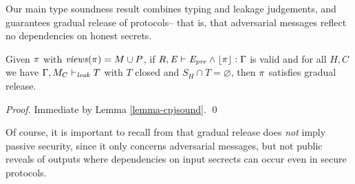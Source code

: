 Our main type soundness result combines typing and leakage judgements,
and guarantees gradual release of protocols-- that is, that adversarial
messages reflect no dependencies on honest secrets.
\begin{theorem}
  Given $\pi$ with $\mathit{views}(\pi) = M \cup P$, if $R,\mathit{E} \vdash \mathit{E}_{\mathit{pre}} \wedge \lfloor \pi \rfloor : \Gamma$
  is valid and for all $H,C$ we have $\Gamma,M_C \vdash_{\mathit{leak}} T$ with $T$ closed
  and $S_H \cap T = \varnothing$, then $\pi$ satisfies gradual release.
\end{theorem}
\begin{proof}
  Immediate by Lemma \ref{lemma-cpjsound}. \qed
\end{proof}

\leakjfig

Of course, it is important to recall from \cite{skalka-near-ppdp24}
that gradual release does \emph{not} imply passive security, since it
only concerns adversarial messages, but not public reveals of outputs
where dependencies on input secrects can occur even in secure
protocols.

\begin{comment}
\subsection{Examples}

\begin{verbatimtab}
m[s1]@2 := (s[1] - r[local] - r[x])@1
m[s1]@3 := r[x]@1

// m[s1]@2 : { c(r[x]@1, { c(r[local]@1, {s[1]@1} ) }
// m[s1]@3 : { r[x]@1 }
\end{verbatimtab}

\begin{verbatimtab}
m[x]@1 := s2(s[x],-r[x],r[x])@2

// m[x]@1 == s[x]@2 + -r[x]@2 
// m[x]@1 : { c(r[x]@2, { s[x]@2 }) } 

m[y]@1 := OT(s[y]@1,-r[y],r[y])@2

// m[y]@1 == s[y]@1 + -r[y]@2
// m[y]@1 : { c(r[y]@2, { s[y]@1 }) } 
\end{verbatimtab}
\end{comment}
